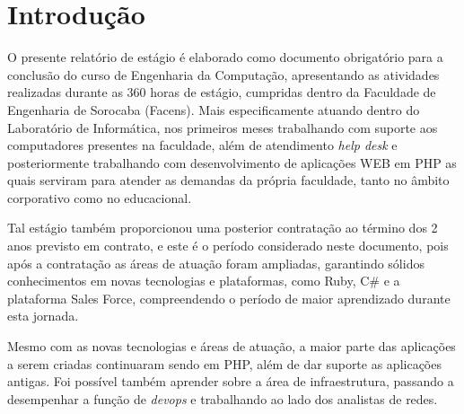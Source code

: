 \documentclass[
	12pt,				%
	oneside,			%
	a4paper,			%
	chapter=TITLE,		%
	section=TITLE,		%
	sumario=tradicional %
	english,			%
	french,				%
	spanish,			%
	brazil				%
	]{abntex2}
\begin{document}
%

%




%

%

%





\textual
\pagestyle{simple}


\chapter{Introdução}
\label{chap:cap1}
O presente relatório de estágio é elaborado como documento obrigatório para a conclusão do curso de Engenharia da Computação, apresentando as atividades realizadas durante as 360 horas de estágio, cumpridas dentro da Faculdade de Engenharia de Sorocaba (Facens). Mais especificamente atuando dentro do Laboratório de Informática, nos primeiros meses trabalhando com suporte aos computadores presentes na faculdade, além de atendimento \textit{help desk} e posteriormente trabalhando com desenvolvimento de aplicações WEB em PHP as quais serviram para atender as demandas da própria faculdade, tanto no âmbito corporativo como no educacional.

Tal estágio também proporcionou uma posterior contratação ao término dos 2 anos previsto em contrato, e este é o período considerado neste documento, pois após a contratação as áreas de atuação foram ampliadas, garantindo sólidos conhecimentos em novas tecnologias e plataformas, como Ruby, C\# e a plataforma Sales Force, compreendendo o período de maior aprendizado durante esta jornada. 

Mesmo com as novas tecnologias e áreas de atuação, a maior parte das aplicações a serem criadas continuaram sendo em PHP, além de dar suporte as aplicações antigas. Foi possível também aprender sobre a área de infraestrutura, passando a desempenhar a função de \textit{devops} e trabalhando ao lado dos analistas de redes.
\end{document}
